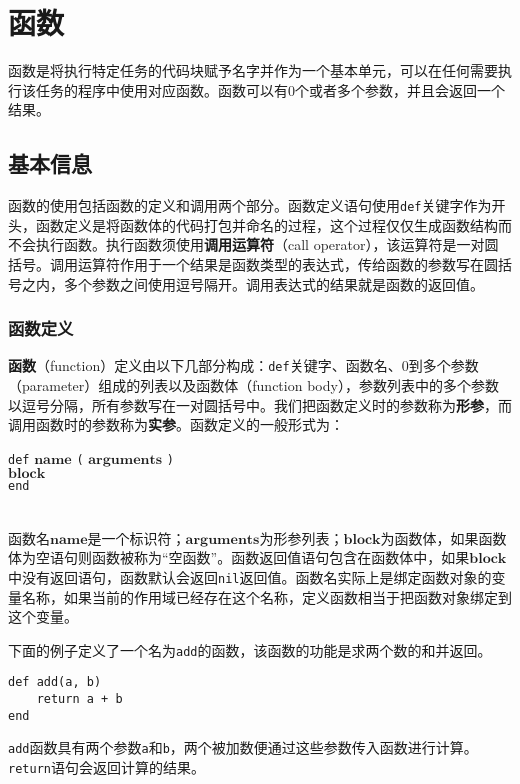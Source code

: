 \chapter{函数}

函数是将执行特定任务的代码块赋予名字并作为一个基本单元，可以在任何需要执行该任务的程序中使用对应函数。函数可以有0个或者多个参数，并且会返回一个结果。

\section{基本信息}

函数的使用包括函数的定义和调用两个部分。函数定义语句使用\texttt{def}关键字作为开头，函数定义是将函数体的代码打包并命名的过程，这个过程仅仅生成函数结构而不会执行函数。执行函数须使用\textbf{调用运算符}（call operator），该运算符是一对圆括号。调用运算符作用于一个结果是函数类型的表达式，传给函数的参数写在圆括号之内，多个参数之间使用逗号隔开。调用表达式的结果就是函数的返回值。

\subsection{函数定义}

\textbf{函数}（function）定义由以下几部分构成：\texttt{def}关键字、函数名、0到多个参数（parameter）组成的列表以及函数体（function body），参数列表中的多个参数以逗号分隔，所有参数写在一对圆括号中。我们把函数定义时的参数称为\textbf{形参}，而调用函数时的参数称为\textbf{实参}。函数定义的一般形式为：
\begin{algorithm}
    \texttt{def} $\bm{name}$ \texttt{(} $\bm{arguments}$ \texttt{)} \\
        \qquad $\bm{block}$ \\
    \texttt{end}
\end{algorithm}\vspace{-0.6em}\\
函数名$\bm{name}$是一个标识符；$\bm{arguments}$为形参列表；$\bm{block}$为函数体，如果函数体为空语句则函数被称为``空函数''。函数返回值语句包含在函数体中，如果$\bm{block}$中没有返回语句，函数默认会返回\texttt{nil}返回值。函数名实际上是绑定函数对象的变量名称，如果当前的作用域已经存在这个名称，定义函数相当于把函数对象绑定到这个变量。

下面的例子定义了一个名为\texttt{add}的函数，该函数的功能是求两个数的和并返回。
\begin{lstlisting}[language=berry, numbers=none]
def add(a, b)
    return a + b
end
\end{lstlisting}
\texttt{add}函数具有两个参数\texttt{a}和\texttt{b}，两个被加数便通过这些参数传入函数进行计算。\texttt{return}语句会返回计算的结果。

